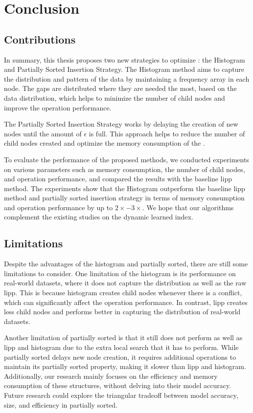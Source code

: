 



\chapter{Conclusion}
\section{Contributions}
In summary, this thesis proposes two new strategies to optimize \learnindex: the Histogram and Partially Sorted Insertion Strategy. The Histogram method aims to capture the distribution and pattern of the data by maintaining a frequency array in each node. The gaps are distributed where they are needed the most, based on the data distribution, which helps to minimize the number of child nodes and improve the operation performance.

The Partially Sorted Insertion Strategy works by delaying the creation of new nodes until the amount of $\epsilon$ is full. This approach helps to reduce the number of child nodes created and optimize the memory consumption of the \learnindex.

To evaluate the performance of the proposed methods, we conducted experiments on various parameters such as memory consumption, the number of child nodes, and operation performance, and compared the results with the baseline \acrshort{lipp} method. The experiments show that the Histogram outperform the baseline \acrshort{lipp} method and partially sorted insertion strategy in terms of memory consumption and operation performance by up to \textbf{$2\times - 3\times$}. We hope that our algorithms complement the existing studies on the dynamic learned index.

\section{Limitations}
Despite the advantages of the histogram and partially sorted, there are still some limitations to consider. One limitation of the histogram is its performance on real-world datasets, where it does not capture the distribution as well as the raw \acrshort{lipp}. This is because histogram creates child nodes whenever there is a conflict, which can significantly affect the operation performance. In contrast, \acrshort{lipp} creates less child nodes and performs better in capturing the distribution of real-world datasets.

Another limitation of partially sorted is that it still does not perform as well as \acrshort{lipp} and histogram due to the extra local search that it has to perform. While partially sorted delays new node creation, it requires additional operations to maintain its partially sorted property, making it slower than \acrshort{lipp} and histogram. Additionally, our research mainly focuses on the efficiency and memory consumption of these \learnindex structures, without delving into their model accuracy. Future research could explore the triangular tradeoff between model accuracy, size, and efficiency in partially sorted.

